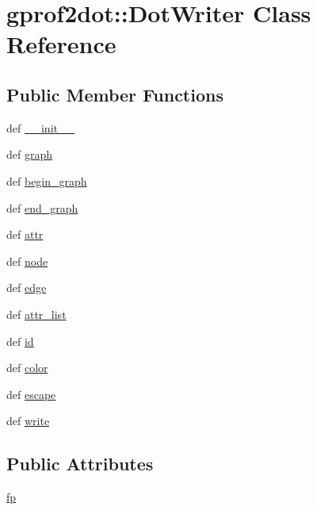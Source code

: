 \hypertarget{classgprof2dot_1_1DotWriter}{
\section{gprof2dot::DotWriter Class Reference}
\label{classgprof2dot_1_1DotWriter}
}
\subsection*{Public Member Functions}
\begin{DoxyCompactItemize}
\item 
def \hyperlink{classgprof2dot_1_1DotWriter_a56d86338edd95cc7c4018d3bc083d64a}{\_\-\_\-init\_\-\_\-}
\item 
def \hyperlink{classgprof2dot_1_1DotWriter_a4e91d75c9bac72b29be59956676c66de}{graph}
\item 
def \hyperlink{classgprof2dot_1_1DotWriter_a45451f875299bba49dcefb9bc53c298a}{begin\_\-graph}
\item 
def \hyperlink{classgprof2dot_1_1DotWriter_a74dc98f24aa019be858aa060586f6823}{end\_\-graph}
\item 
def \hyperlink{classgprof2dot_1_1DotWriter_a1ffd72f8933e8c278ba235cd8f2fba1a}{attr}
\item 
def \hyperlink{classgprof2dot_1_1DotWriter_af42321fbb48851c5fbd01b7dc7e0b810}{node}
\item 
def \hyperlink{classgprof2dot_1_1DotWriter_a26bc5afdf3921b3b6b5df9a0a9309de5}{edge}
\item 
def \hyperlink{classgprof2dot_1_1DotWriter_a5b16841885002ef23c1a5140719e3984}{attr\_\-list}
\item 
def \hyperlink{classgprof2dot_1_1DotWriter_afbea6f6f87496d4babd43853a97f5582}{id}
\item 
def \hyperlink{classgprof2dot_1_1DotWriter_ab2ca20eced759774a87874a4d6df748d}{color}
\item 
def \hyperlink{classgprof2dot_1_1DotWriter_ad71838639495e6f834fd01657dcaff41}{escape}
\item 
def \hyperlink{classgprof2dot_1_1DotWriter_a9746c83e8b3bed4537d408fb92595e24}{write}
\end{DoxyCompactItemize}
\subsection*{Public Attributes}
\begin{DoxyCompactItemize}
\item 
\hyperlink{classgprof2dot_1_1DotWriter_a266d8247c93fdd14af35568d52411253}{fp}
\end{DoxyCompactItemize}


